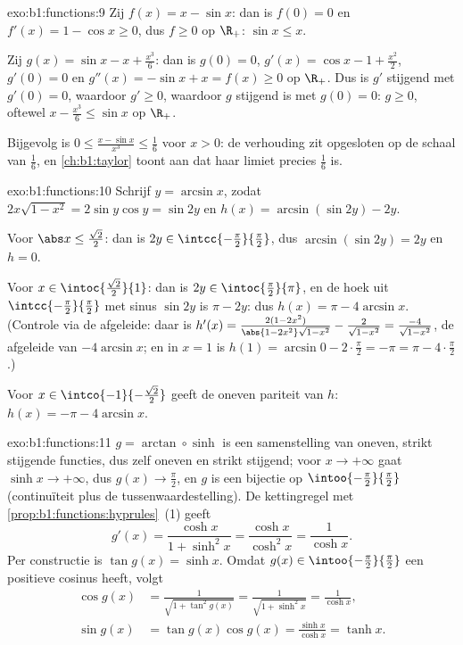\begin{solution}{exo:b1:functions:9}
Zij $f(x) = x - \sin x$: dan is $f(0) = 0$ en $f'(x) = 1 - \cos x \geq
0$, dus $f \geq 0$ op $\R_+$: $\sin x \leq x$.

Zij $g(x) = \sin x - x + \frac{x^3}{6}$: dan is $g(0) = 0$, $g'(x) =
\cos x - 1 + \frac{x^2}{2}$, $g'(0) = 0$ en $g''(x) = -\sin x + x = f(x)
\geq 0$ op $\R_+$. Dus is $g'$ stijgend met $g'(0) = 0$, waardoor $g'
\geq 0$, waardoor $g$ stijgend is met $g(0) = 0$: $g \geq 0$, oftewel $x
- \frac{x^3}{6} \leq \sin x$ op $\R_+$.

Bijgevolg is $0 \leq \frac{x - \sin x}{x^3} \leq \frac 16$ voor $x > 0$:
de verhouding zit opgesloten op de schaal van $\frac16$, en
\cref{ch:b1:taylor} toont aan dat haar limiet precies $\frac 16$ is.
\end{solution}

\begin{solution}{exo:b1:functions:10}
Schrijf $y = \arcsin x$, zodat $2x\sqrt{1 - x^2} = 2\sin y\cos y = \sin
2y$ en $h(x) = \arcsin(\sin 2y) - 2y$.

Voor $\abs x \leq \frac{\sqrt 2}{2}$: dan is $2y \in
\intcc{-\frac\pi2}{\frac\pi2}$, dus $\arcsin(\sin 2y) = 2y$ en $h = 0$.

Voor $x \in \intoc{\frac{\sqrt 2}{2}}{1}$: dan is $2y \in
\intoc{\frac\pi2}{\pi}$, en de hoek uit $\intcc{-\frac\pi2}{\frac\pi2}$
met sinus $\sin 2y$ is $\pi - 2y$: dus $h(x) = \pi - 4\arcsin x$.
(Controle via de afgeleide: daar is $h'(x) = \frac{2(1 - 2x^2)}{\abs{1 -
2x^2}\sqrt{1 - x^2}} - \frac{2}{\sqrt{1-x^2}} = \frac{-4}{\sqrt{1 -
x^2}}$, de afgeleide van $-4\arcsin x$; en in $x = 1$ is $h(1) = \arcsin
0 - 2\cdot\frac\pi2 = -\pi = \pi - 4\cdot\frac\pi2$.)

Voor $x \in \intco{-1}{-\frac{\sqrt 2}{2}}$ geeft de oneven pariteit van
$h$: $h(x) = -\pi - 4\arcsin x$.
\end{solution}

\begin{solution}{exo:b1:functions:11}
$g = \arctan \circ \sinh$ is een samenstelling van oneven, strikt
stijgende functies, dus zelf oneven en strikt stijgend; voor $x \to
+\infty$ gaat $\sinh x \to +\infty$, dus $g(x) \to \frac\pi2$, en $g$ is
een bijectie op $\intoo{-\frac\pi2}{\frac\pi2}$ (continuïteit plus de
tussenwaardestelling). De kettingregel met
\cref{prop:b1:functions:hyprules}~(1) geeft
\[
g'(x) = \frac{\cosh x}{1 + \sinh^2 x} = \frac{\cosh x}{\cosh^2 x}
= \frac{1}{\cosh x} .
\]
Per constructie is $\tan g(x) = \sinh x$. Omdat $g(x) \in
\intoo{-\frac\pi2}{\frac\pi2}$ een positieve cosinus heeft, volgt
\begin{align*}
\cos g(x) &= \frac{1}{\sqrt{1 + \tan^2 g(x)}}
= \frac{1}{\sqrt{1 + \sinh^2 x}} = \frac{1}{\cosh x},\\
\sin g(x) &= \tan g(x) \cos g(x) = \frac{\sinh x}{\cosh x} = \tanh x .
\end{align*}
\end{solution}

